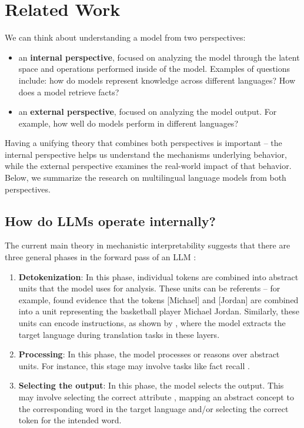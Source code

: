 \section{Related Work}

We can think about understanding a model from two perspectives:
\begin{itemize}
    \item an \textbf{internal perspective}, focused on analyzing the model through the latent space and operations performed inside of the model. Examples of questions include: how do models represent knowledge across different languages? How does a model retrieve facts? 
    \item an \textbf{external perspective}, focused on analyzing the model output. For example, how well do models perform in different languages? 
\end{itemize}
Having a unifying theory that combines both perspectives is important -- the internal perspective helps us understand the mechanisms underlying behavior, while the external perspective examines the real-world impact of that behavior. Below, we summarize the research on multilingual language models from both perspectives.

\subsection{How do LLMs operate internally?}
The current main theory in mechanistic interpretability suggests that there are three general phases in the forward pass of an LLM \cite{olahfeaturesllm, nanda2023progress, wendler2024llamasworkenglishlatent, dumas2024llamas, fierro2025multilinguallanguagemodelsremember}:
\begin{enumerate}
    \item \textbf{Detokenization}:  In this phase, individual tokens are combined into abstract units that the model uses for analysis. These units can be referents -- for example, \cite{nanda2023progress} found evidence that the tokens [Michael] and [Jordan] are combined into a unit representing the basketball player Michael Jordan. Similarly, these units can encode instructions, as shown by \cite{dumas2024llamas}, where the model extracts the target language during translation tasks in these layers.
    \item \textbf{Processing}: In this phase, the model processes or reasons over abstract units. For instance, this stage may involve tasks like fact recall \cite{geva-etal-2023-dissecting, nanda2023progress}.
    \item {\textbf{Selecting the output}}: In this phase, the model selects the output. This may involve selecting the correct attribute \cite{nanda2023progress}, mapping an abstract concept to the corresponding word in the target language \cite{wendler2024llamasworkenglishlatent} and/or selecting the correct token for the intended word.  
\end{enumerate}


